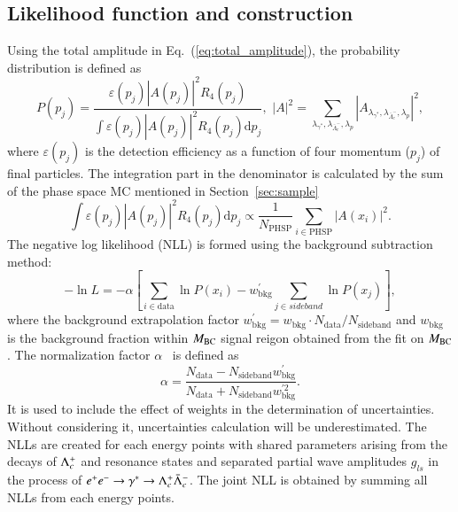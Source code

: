 \subsection{Likelihood function and construction}
\label{sec:likelihood}
Using the total amplitude in Eq.~(\ref{eq:total_amplitude}), the probability distribution is defined as
\begin{equation}
    P(p_j) = \frac{\varepsilon(p_j)|A(p_j)|^2R_4(p_j)}{\int\varepsilon(p_j)|A(p_j)|^2R_4(p_j)\mathrm{d}p_j}, \,\,|A|^2 = \sum_{\lambda_{\gamma^*},\lambda_{\bar{\Lambda}_c^-}, \lambda_p}|A_{\lambda_{\gamma^*},\lambda_{\bar{\Lambda}_c^-},\lambda_p}|^2,
\end{equation}
where $\varepsilon(p_j)$ is the detection efficiency as a function of four momentum ($p_j$) of final particles. The integration part in the denominator is calculated by the sum of the phase space MC mentioned in Section~\ref{sec:sample} 
\begin{equation}\label{eq:mc_integration}
    \int\varepsilon(p_j)|A(p_j)|^2R_4(p_j)\mathrm{d}p_j \varpropto \frac{1}{N_\mathrm{PHSP}}\sum_{i \in \mathrm{{PHSP}}} |A(x_i)|^2.
\end{equation}
The negative log likelihood (NLL) is formed using the background subtraction method:
\begin{equation}\label{eq:nll}
    -\ln L = -\alpha\left[\sum_{i\in\mathrm{data}}\ln P(x_i) - w^\prime_\mathrm{bkg}\sum_{j\in sideband} \ln P(x_j)\right],
\end{equation}
where the background extrapolation factor $w^{\prime}_\mathrm{bkg} = w_\mathrm{bkg} \cdot N_\mathrm{data}/N_\mathrm{sideband}$ and $w_\mathrm{bkg}$ is the background fraction within $M_{\rm{BC}}$ signal reigon obtained from the fit on $M_{\rm{BC}}$. The normalization factor $\alpha$~\cite{Langenbruch_2022} is defined as 
\begin{equation}
    \alpha = \frac{N_\mathrm{data} - N_\mathrm{sideband}w^{\prime}_\mathrm{bkg}}{N_\mathrm{data} + N_\mathrm{sideband}w^{\prime 2}_\mathrm{bkg}}.
\end{equation}
It is used to include the effect of weights in the determination of uncertainties. Without considering it, uncertainties calculation will be underestimated.
The NLLs are created for each energy points with shared parameters arising from the decays of $\Lambda_{c}^{+}$ and resonance states and separated partial wave amplitudes $g_{ls}$ in the process of $e^+e^-\rightarrow\gamma^*\rightarrow \Lambda_{c}^{+}\bar{\Lambda}_{c}^{-}$. The joint NLL is obtained by summing all NLLs from each energy points. 

